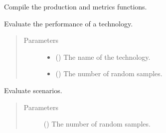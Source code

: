 \documentclass[letterpaper,10pt,english]{sphinxmanual}
\begin{document}
\begin{fulllineitems}

\begin{fulllineitems}
\label{\detokenize{tyche:tyche.Designs.Designs.compile}}
Compile the production and metrics functions.

\end{fulllineitems}


\begin{fulllineitems}
\label{\detokenize{tyche:tyche.Designs.Designs.evaluate}}
Evaluate the performance of a technology.
\begin{quote}\begin{description}
\item[{Parameters}] \leavevmode\begin{itemize}
\item {} 
 () \textendash{} The name of the technology.

\item {} 
 () \textendash{} The number of random samples.

\end{itemize}

\end{description}\end{quote}

\end{fulllineitems}


\begin{fulllineitems}
\label{\detokenize{tyche:tyche.Designs.Designs.evaluate_scenarios}}
Evaluate scenarios.
\begin{quote}\begin{description}
\item[{Parameters}] \leavevmode
{} () \textendash{} The number of random samples.


\end{description}
\end{quote}
\end{fulllineitems}
\end{fulllineitems}
\end{document}
